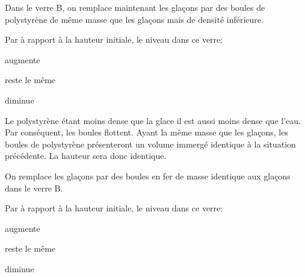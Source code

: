 


\begin{enonce}
Dans le verre B, on remplace maintenant les glaçons par des boules
de polystyrène de même masse que les glaçons mais de densité inférieure.

Par à rapport à la hauteur initiale, le niveau dans ce verre:

	\begin{listeQCM3Colonnes}
	\item augmente
	\item reste le même
	\item diminue
	\end{listeQCM3Colonnes}
\end{enonce}

\reponse{\reponseB{}}
\begin{corrige}
Le polystyrène étant moins dense que la glace il est aussi moins dense que l'eau. Par conséquent, les boules flottent. Ayant la même masse que les glaçons, les boules de polystyrène présenteront un volume immergé identique à la situation précédente. La hauteur sera donc identique.
\end{corrige}




\begin{enonce}
On remplace les glaçons par des boules en fer de masse identique aux glaçons dans le verre B.

Par à rapport à la hauteur initiale, le niveau dans ce verre:

	\begin{listeQCM3Colonnes}
	\item augmente
	\item reste le même
	\item diminue
	\end{listeQCM3Colonnes}
\end{enonce}

\reponse{\reponseC{}}

